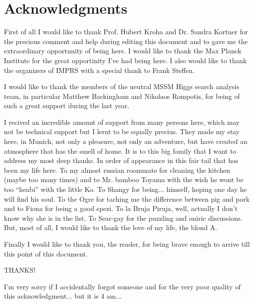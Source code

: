 \cleardoublepage
\renewcommand*{\chaptermarkformat}{}
  \section*{\centering Acknowledgments}\thispagestyle{plain}

First of all I would like to thank Prof. Hubert Kroha and Dr. Sandra Kortner for the precious comment and help 
during editing this document and to gave me the extraordinary opportunity of being here. 
I would like to thank the Max Planck Institute for the great opportinity I've had being here.
I also would like to thank the organizers of IMPRS with  a special thank to Frank Steffen.

I would like to thank the members of the neutral MSSM Higgs search analysis team, in particular 
Matthew Backingham and Nikolaos Rompotis, for being of such a great support during the last 
year.

I recived an incredible amount of support from many persons here, which may not be technical support but I lernt
to be equally precius. They made my stay here, in Munich, not only a pleasure,
not only an adventure, but have created an atmosphere that has the smell of home. It is to this big family that 
I want to address my most deep thanks. In order of appearance in this  fair tail that has been
my life here. To my almost russian roommate for cleaning the kitchen (maybe too many times) and to Mr. bamboo Toyama
with the  wish he wont be too ``heabi'' with the little Ko. To Shangy for being... himself, hoping one day he will find
his soul. To the Ogre for taching me the difference between pig and pork and to Fiona for being a good spezi.
To la Bruja Piruja, well, actually I don't know why she is in the list. To Sear-gay for the puzzling and oniric discussions.
But, most of all, I would like to thank the love of my life, the blond A.


Finally I would like to thank you, the reader, for being brave enough to arrive till this point of this document.

\begin{center}
{\LARGE THANKS!}
\end{center}

{\small I'm very sorry if I accidentally forgot someone and for the very poor quality of this acknowledgment...
but it is 4 am...}

